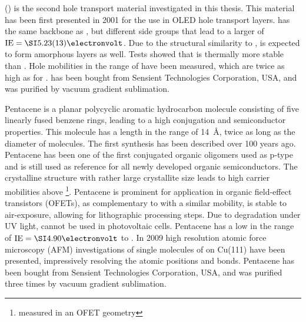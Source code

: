 \minisec{\lili}
\lili (\liliLong) is the second hole transport material investigated in this thesis. This material has been first presented in 2001\cite{Hashimoto2001} for the use in OLED hole transport layers.
\lili has the same backbone as \meo, but different side groups that lead to a  larger \IE of \mbox{$\text{IE}=\eV{5.23(13)}$}\cite{Meerheim2011}.
Due to the structural similarity to \meo, \lili is expected to form amorphous layers as well. Tests showed that \lili is thermally more stable than \meo. Hole mobilities in the range of \mob[5.7E-05]\mphOFET have been measured, which are twice as high as for \meo.
\lili has been bought from Sensient Technologies Corporation, USA, and was purified by vacuum gradient sublimation.

Pentacene is a planar polycyclic aromatic hydrocarbon molecule consisting of five linearly fused benzene rings, leading to a high conjugation and semiconductor properties. This molecule has a length in the range of \SI{14}{\angstrom}, twice as long as the diameter of \CS molecules. The first synthesis has been described over 100 years ago\cite{Mills1912}.
Pentacene has been one of the first conjugated organic oligomers used as p-type \SC and is still used as reference for all newly developed organic semiconductors\cite{Murphy2007}. The crystalline structure\cite{Ha2009} with rather large crystallite size\cite{Kleemann2012a} leads to high carrier mobilities above \cite{Murphy2007}\footnote{measured in an OFET geometry}. Pentacene is prominent for application in organic field-effect transistors (OFETs), as complementary to \CS with a similar mobility, \pen is stable to air-exposure, allowing for lithographic processing steps\cite{Steudel2006}. Due to degradation under UV light, \pen cannot be used in photovoltaic cells.
Pentacene has a low \IE in the range of \mbox{$\text{IE}=\eV{4.90}$}\cite{Salzmann2012} to \cite{Fukagawa2006}.
In 2009 high resolution atomic force microscopy (AFM) investigations of single molecules of \pen on Cu(111) have been presented\cite{Gross2009}, impressively resolving the atomic positions and bonds.
Pentacene has been bought from Sensient Technologies Corporation, USA,
and was purified three times by vacuum gradient sublimation.

